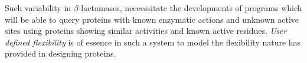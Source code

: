 Such variability in $\beta$-lactamases, neccessitate the developments of programs which will be able to query proteins with known enzymatic actions
and unknown active sites using proteins showing similar activities and known active residues. {\em User defined flexibility} is of essence in such 
a system to model the flexibility nature has provided in designing proteins.




